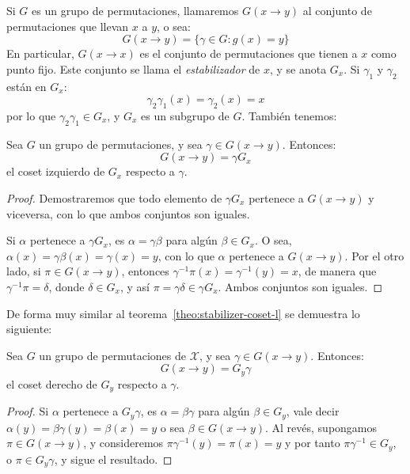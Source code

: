   Si \(G\) es un grupo de permutaciones,
  llamaremos \(G(x \rightarrow y)\)
  al conjunto de permutaciones que llevan \(x\) a \(y\),
  o sea:
  \begin{equation*}
    G(x \rightarrow y) = \{\gamma \in G \colon g(x) = y\}
  \end{equation*}
  En particular,
  \(G(x \rightarrow x)\)
  es el conjunto de permutaciones
  que tienen a \(x\) como punto fijo.
  Este conjunto se llama el \emph{estabilizador} de \(x\),%
  y se anota \(G_x\).
  Si \(\gamma_1\) y \(\gamma_2\) están en \(G_x\):
  \begin{equation*}
    \gamma_2 \gamma_1(x) = \gamma_2(x) = x
  \end{equation*}
  por lo que \(\gamma_2 \gamma_1 \in G_x\),
  y \(G_x\) es un subgrupo de \(G\).
  También tenemos:
  \begin{theorem}
    \label{theo:stabilizer-coset-l}
    Sea \(G\) un grupo de permutaciones,
    y sea \(\gamma \in G(x \rightarrow y)\).
    Entonces:
    \begin{equation*}
      G(x \rightarrow y) = \gamma G_x
    \end{equation*}
    el coset izquierdo de \(G_x\) respecto a \(\gamma\).
  \end{theorem}
  \begin{proof}
    Demostraremos que todo elemento de \(\gamma G_x\)
    pertenece a \(G(x \rightarrow y)\) y viceversa,
    con lo que ambos conjuntos son iguales.

    Si \(\alpha\) pertenece a \(\gamma G_x\),
    es \(\alpha = \gamma \beta\) para algún \(\beta \in G_x\).
    O sea,
    \(\alpha(x) = \gamma \beta(x) = \gamma(x) = y\),
    con lo que \(\alpha\) pertenece a \(G(x \rightarrow y)\).
    Por el otro lado,
    si \(\pi \in G(x \rightarrow y)\),
    entonces \(\gamma^{-1} \pi(x) = \gamma^{-1}(y) = x\),
    de manera que \(\gamma^{-1} \pi = \delta\),
    donde \(\delta \in G_x\),
    y así \(\pi = \gamma \delta \in \gamma G_x\).
    Ambos conjuntos son iguales.
  \end{proof}
  De forma muy similar al teorema~\ref{theo:stabilizer-coset-l}
  se demuestra lo siguiente:
  \begin{theorem}
    \label{theo:stabilizer-coset-r}
    Sea \(G\) un grupo de permutaciones de \(\mathcal{X}\),
    y sea \(\gamma \in G(x \rightarrow y)\).
    Entonces:
    \begin{equation*}
      G(x \rightarrow y) = G_y \gamma
    \end{equation*}
    el coset derecho de \(G_y\) respecto a \(\gamma\).
  \end{theorem}
  \begin{proof}
    Si \(\alpha\) pertenece a \(G_y \gamma\),
    es \(\alpha = \beta \gamma\) para algún \(\beta \in G_y\),
    vale decir
    \(
      \alpha(y)
	= \beta \gamma(y)
	= \beta(x)
	= y
    \)
    o sea \(\beta \in G(x \rightarrow y)\).
    Al revés,
    supongamos \(\pi \in G(x \rightarrow y)\),
    y consideremos
    \(
      \pi \gamma^{-1}(y)
	= \pi(x)
	= y
    \)
    y por tanto \(\pi \gamma^{-1} \in G_y\),
    o \(\pi \in G_y \gamma\),
    y sigue el resultado.
  \end{proof}

